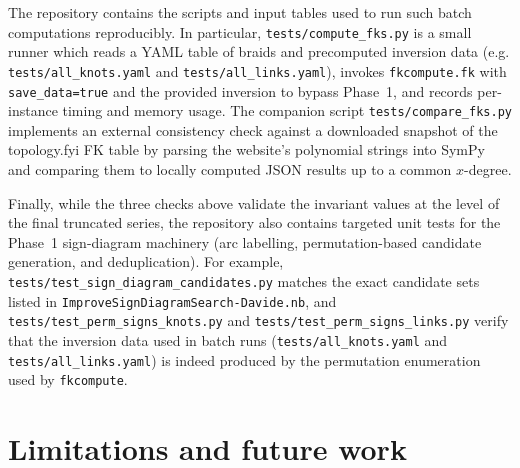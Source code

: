 \documentclass[twocolumn]{article}
\begin{document}
The repository contains the scripts and input tables used to run such batch
computations reproducibly.
In particular, \texttt{tests/compute\_fks.py} is a small runner which reads a
YAML table of braids and precomputed inversion data (e.g.
\texttt{tests/all\_knots.yaml} and \texttt{tests/all\_links.yaml}), invokes
\texttt{fkcompute.fk} with \texttt{save\_data=true} and the provided inversion
to bypass Phase~1, and records per-instance timing and memory usage.
The companion script \texttt{tests/compare\_fks.py} implements an external
consistency check against a downloaded snapshot of the topology.fyi FK table by
parsing the website's polynomial strings into SymPy and comparing them to locally
computed JSON results up to a common $x$-degree.

Finally, while the three checks above validate the invariant values at the level
of the final truncated series, the repository also contains targeted unit tests
for the Phase~1 sign-diagram machinery (arc labelling, permutation-based
candidate generation, and deduplication).  For example,
\texttt{tests/test\_sign\_diagram\_candidates.py} matches the exact candidate
sets listed in \texttt{ImproveSignDiagramSearch-Davide.nb}, and
\texttt{tests/test\_perm\_signs\_knots.py} and
\texttt{tests/test\_perm\_signs\_links.py} verify that the inversion data used
in batch runs (\texttt{tests/all\_knots.yaml} and \texttt{tests/all\_links.yaml})
is indeed produced by the permutation enumeration used by \texttt{fkcompute}.

\section{Limitations and future work}



\end{document}
